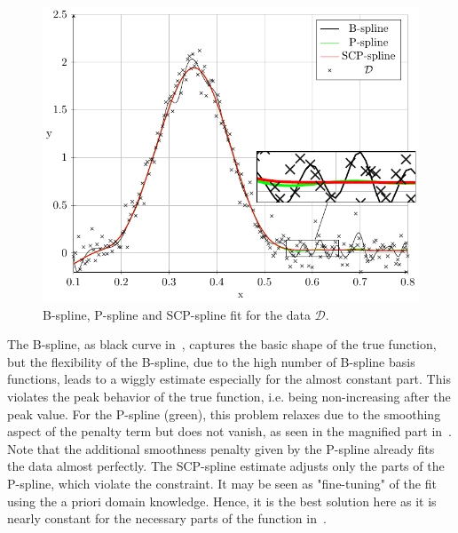 \begin{figure}[H]
	\centering
	\includegraphics{graphics/pgfplots/cha4/exp-peak.pdf}
	\caption{B-spline, P-spline and SCP-spline fit for the data $\mathcal{D}$.}
	\label{fig:test-func-peak-fit}
\end{figure}
%
The B-spline, as black curve in~, captures the basic shape of the true function, but the flexibility of the B-spline, due to the high number of B-spline basis functions, leads to a wiggly estimate especially for the almost constant part. This violates the peak behavior of the true function, i.e. being non-increasing after the peak value. For the P-spline (green), this problem relaxes due to the smoothing aspect of the penalty term but does not vanish, as seen in the magnified part in~. Note that the additional smoothness penalty given by the P-spline already fits the data almost perfectly. The SCP-spline estimate adjusts only the parts of the P-spline, which violate the constraint. It may be seen as "fine-tuning" of the fit using the a priori domain knowledge. Hence, it is the best solution here as it is nearly constant for the necessary parts of the function in~.  

